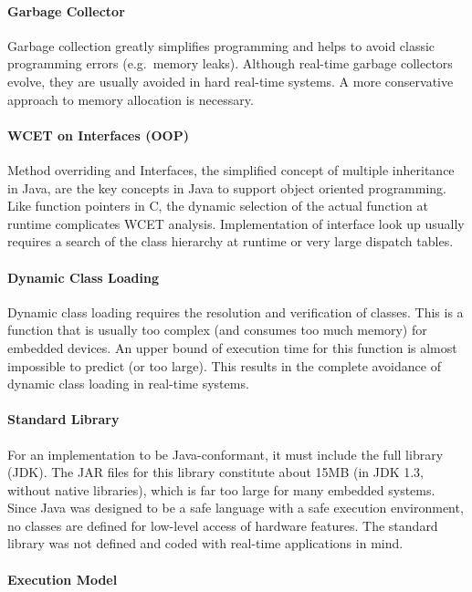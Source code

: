 \paragraph{Garbage Collector}

Garbage collection greatly simplifies programming and helps to avoid
classic programming errors (e.g.\ memory leaks). Although real-time
garbage collectors evolve, they are usually avoided in hard
real-time systems. A more conservative approach to memory allocation
is necessary.

\paragraph{WCET on Interfaces (OOP)}

Method overriding and Interfaces, the simplified concept of multiple
inheritance in Java, are the key concepts in Java to support object
oriented programming. Like function pointers in C, the dynamic
selection of the actual function at runtime complicates WCET
analysis. Implementation of interface look up usually requires a
search of the class hierarchy at runtime or very large dispatch
tables.

\paragraph{Dynamic Class Loading}

Dynamic class loading requires the resolution and verification of
classes. This is a function that is usually too complex (and
consumes too much memory) for embedded devices. An upper bound of
execution time for this function is almost impossible to predict (or
too large). This results in the complete avoidance of dynamic class
loading in real-time systems.

\paragraph{Standard Library}

For an implementation to be Java-conformant, it must include the
full library (JDK). The JAR files for this library constitute about
15MB (in JDK 1.3, without native libraries), which is far too large
for many embedded systems. Since Java was designed to be a safe
language with a safe execution environment, no classes are defined
for low-level access of hardware features. The standard library was
not defined and coded with real-time applications in mind.

\paragraph{Execution Model}

